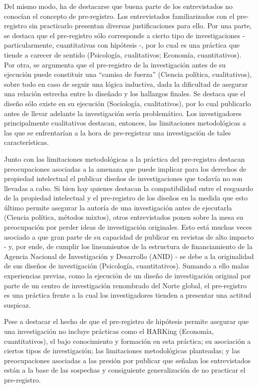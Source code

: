 \documentclass[
  letterpaper,
  DIV=11,
  numbers=noendperiod]{scrreprt}
\begin{document}
Del mismo modo, ha de destacarse que buena parte de los entrevistados no
conocían el concepto de pre-registro. Los entrevistados familiarizados
con el pre-registro sin practicarlo presentan diversas justificaciones
para ello. Por una parte, se destaca que el pre-registro sólo
corresponde a cierto tipo de investigaciones - particularmente,
cuantitativas con hipótesis -, por lo cual es una práctica que tiende a
carecer de sentido (Psicología, cualitativos; Economía, cuantitativos).
Por otra, se argumenta que el pre-registro de la investigación antes de
su ejecución puede constituir una ``camisa de fuerza'' (Ciencia
política, cualitativos), sobre todo en caso de seguir una lógica
inductiva, dada la dificultad de asegurar una relación estrecha entre lo
diseñado y los hallazgos finales. Se destaca que el diseño sólo existe
en su ejecución (Sociología, cualitativos), por lo cual publicarlo antes
de llevar adelante la investigación sería problemático. Los
investigadores principalmente cualitativos destacan, entonces, las
limitaciones metodológicas a las que se enfrentarían a la hora de
pre-registrar una investigación de tales características.

Junto con las limitaciones metodológicas a la práctica del pre-registro
destacan preocupaciones asociadas a la amenaza que puede implicar para
los derechos de propiedad intelectual el publicar diseños de
investigaciones que todavía no son llevadas a cabo. Si bien hay quienes
destacan la compatibilidad entre el resguardo de la propiedad
intelectual y el pre-registro de los diseños en la medida que esto
último permite asegurar la autoría de una investigación antes de
ejecutarla (Ciencia política, métodos mixtos), otros entrevistados ponen
sobre la mesa su preocupación por perder ideas de investigación
originales. Esto está muchas veces asociado a que gran parte de su
capacidad de publicar en revistas de alto impacto - y, por ende, de
cumplir los lineamientos de la estructura de financiamiento de la
Agencia Nacional de Investigación y Desarrollo (ANID) - se debe a la
originalidad de sus diseños de investigación (Psicología,
cuantitativos). Sumando a ello malas experiencias previas, como la
ejecución de un diseño de investigación original por parte de un centro
de investigación renombrado del Norte global, el pre-registro es una
práctica frente a la cual los investigadores tienden a presentar una
actitud suspicaz.

Pese a destacar el hecho de que el pre-registro de hipótesis permite
asegurar que una investigación no incluye prácticas como el HARKing
(Economía, cuantitativos), el bajo conocimiento y formación en esta
práctica; su asociación a ciertos tipos de investigación; las
limitaciones metodológicas planteadas; y las preocupaciones asociadas a
las presión por publicar que señalan los entrevistados están a la base
de las sospechas y consiguiente generalización de no practicar el
pre-registro.
\end{document}
